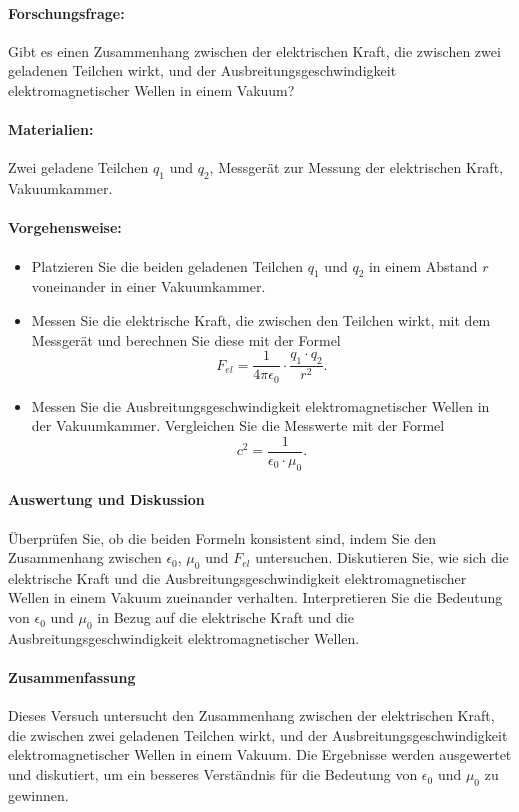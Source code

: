 \documentclass{report}
\begin{document}
\paragraph{Forschungsfrage:}
Gibt es einen Zusammenhang zwischen der elektrischen Kraft, die zwischen zwei geladenen Teilchen wirkt, und der Ausbreitungsgeschwindigkeit elektromagnetischer Wellen in einem Vakuum?

\paragraph{Materialien:}

    Zwei geladene Teilchen $q_1$ und $q_2$,
    Messgerät zur Messung der elektrischen Kraft,
    Vakuumkammer.

\paragraph{Vorgehensweise:}
\begin{itemize}
  \item Platzieren Sie die beiden geladenen Teilchen $q_1$ und $q_2$ in einem Abstand $r$ voneinander in einer Vakuumkammer.
  \item Messen Sie die elektrische Kraft, die zwischen den Teilchen wirkt, mit dem Messgerät und berechnen Sie diese mit der Formel
    $$F_{el} = \dfrac{1}{4  \pi \epsilon_0} \cdot \dfrac{q_1 \cdot q_2}{r^2}.$$
  \item Messen Sie die Ausbreitungsgeschwindigkeit elektromagnetischer Wellen in der Vakuumkammer.
    Vergleichen Sie die Messwerte mit der Formel
    $$c^2 = \dfrac{1}{\epsilon_0 \cdot \mu_0}.$$
\end{itemize}
    \paragraph{Auswertung und Diskussion}

    Überprüfen Sie, ob die beiden Formeln konsistent sind, indem Sie den Zusammenhang zwischen $\epsilon_0$, $\mu_0$ und $F_{el}$ untersuchen.
    Diskutieren Sie, wie sich die elektrische Kraft und die Ausbreitungsgeschwindigkeit elektromagnetischer Wellen in einem Vakuum zueinander verhalten.
    Interpretieren Sie die Bedeutung von $\epsilon_0$ und $\mu_0$ in Bezug auf die elektrische Kraft und die Ausbreitungsgeschwindigkeit elektromagnetischer Wellen.

\paragraph{Zusammenfassung}
Dieses Versuch untersucht den Zusammenhang zwischen der elektrischen Kraft, die
zwischen zwei geladenen Teilchen wirkt, und der Ausbreitungsgeschwindigkeit
elektromagnetischer Wellen in einem Vakuum. Die Ergebnisse werden ausgewertet
und diskutiert, um ein besseres Verständnis für die Bedeutung von $\epsilon_0$
und $\mu_0$ zu gewinnen.
\end{document}
